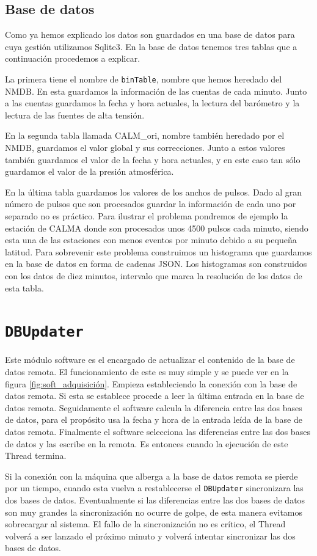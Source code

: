 	\subsection{Base de datos}
		Como ya hemos explicado los datos son guardados en una base de datos para cuya gestión utilizamos Sqlite3. En la base de datos tenemos
		tres tablas que a continuación procedemos a explicar.
	    	\par
		La primera tiene el nombre de \texttt{binTable}, nombre que hemos heredado del NMDB. En esta guardamos la información de las cuentas
		de cada minuto. Junto a las cuentas guardamos la fecha y hora actuales, la lectura del barómetro y la lectura de las fuentes de alta
		tensión.
	    	\par 
		En la segunda tabla llamada CALM\_ori, nombre también heredado por el NMDB, guardamos el valor global y sus correcciones. Junto a
		estos valores también guardamos el valor de la fecha y hora actuales, y en este caso tan sólo guardamos el valor de la presión
		atmosférica.
	    	\par
		En la última tabla guardamos los valores de los anchos de pulsos. Dado al gran número de pulsos que son procesados guardar la
		información de cada uno por separado no es práctico. Para ilustrar el problema pondremos de ejemplo la estación de CALMA donde son
		procesados unos 4500 pulsos cada minuto, siendo esta una de las estaciones con menos eventos por minuto debido a su pequeña latitud.
		Para sobrevenir este problema construimos un histograma que guardamos en la base de datos en forma de cadenas JSON\cite{JSON}. Los
		histogramas son construidos con los datos de diez minutos, intervalo que marca la resolución de los datos de esta tabla.

\section{\texttt{DBUpdater}}
	Este módulo software es el encargado de actualizar el contenido de la base de datos remota. El funcionamiento de este es muy simple y se puede
	ver en la figura \ref{fig:soft_adquisición}. Empieza estableciendo la conexión con la base de datos remota. Si esta se establece procede a leer la
	última entrada en la base de datos remota. Seguidamente el software calcula la diferencia entre las dos bases de datos, para el propósito usa
	la fecha y hora de la entrada leída de la base de datos remota. Finalmente el software selecciona las diferencias entre las dos bases de datos
	y las escribe en la remota. Es entonces cuando la ejecución de este Thread termina. 
	\par
	Si la conexión con la máquina que alberga a la base de datos remota se pierde por un tiempo, cuando esta vuelva a restablecerse el
	\texttt{DBUpdater} sincronizara las dos bases de datos. Eventualmente si las diferencias entre las dos bases de datos son muy grandes la
	sincronización no ocurre de golpe, de esta manera evitamos sobrecargar al sistema. El fallo de la sincronización no es crítico, el Thread
	volverá a ser lanzado el próximo minuto y volverá intentar sincronizar las dos bases de datos.

